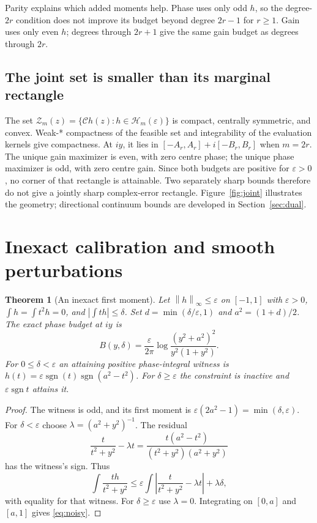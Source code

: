 \documentclass[11pt]{article}
\newtheorem{theorem}{Theorem}[section]
\theoremstyle{remark}\newtheorem{remark}[theorem]{Remark}
\newcommand{\eps}{\varepsilon}
\newcommand{\C}{\mathcal C}
\newcommand{\Hcal}{\mathcal H}
\newcommand{\sgn}{\operatorname{sgn}}
\newcommand{\norm}[1]{\left\lVert#1\right\rVert}
\begin{document}
Parity explains which added moments help. Phase uses only odd $h$, so the
degree-$2r$ condition does not improve its budget beyond degree $2r-1$
for $r\geq1$. Gain uses only even $h$; degrees through $2r+1$ give the same
gain budget as degrees through $2r$.

\subsection{The joint set is smaller than its marginal rectangle}
The set
$\mathcal Z_m(z)=\{\C h(z):h\in\Hcal_m(\eps)\}$
is compact, centrally symmetric, and convex.
Weak-* compactness of the feasible set and integrability of the evaluation
kernels give compactness.
At $iy$, it lies in $[-A_r,A_r]+i[-B_r,B_r]$ when $m=2r$.
The unique gain maximizer is even, with zero centre phase;
the unique phase maximizer is odd, with zero centre gain.
Since both budgets are positive for $\eps>0$, no corner of that rectangle is
attainable. Two separately sharp bounds therefore do not give a jointly sharp
complex-error rectangle.
Figure~\ref{fig:joint} illustrates the geometry; directional continuum bounds
are developed in Section~\ref{sec:dual}.

\section{Inexact calibration and smooth perturbations}\label{sec:noisy}
\begin{theorem}[An inexact first moment]\label{thm:noisy}
Let $\norm h_\infty\leq\eps$ on $[-1,1]$ with $\eps>0$,
$\int h=\int t^2h=0$, and $|\int th|\leq\delta$.
Set $d=\min(\delta/\eps,1)$ and $a^2=(1+d)/2$.
The exact phase budget at $iy$ is
\begin{equation}\label{eq:noisy}
 B(y,\delta)=\frac{\eps}{2\pi}
 \log\frac{(y^2+a^2)^2}{y^2(1+y^2)}.
\end{equation}
For $0\leq\delta<\eps$ an attaining positive phase-integral witness is
$h(t)=\eps\sgn(t)\sgn(a^2-t^2)$.
For $\delta\geq\eps$ the constraint is inactive and $\eps\sgn t$ attains it.
\end{theorem}
\begin{proof}
The witness is odd, and its first moment is
$\eps(2a^2-1)=\min(\delta,\eps)$.
For $\delta<\eps$ choose $\lambda=(a^2+y^2)^{-1}$.
The residual
\[
 \frac{t}{t^2+y^2}-\lambda t
 =\frac{t(a^2-t^2)}{(t^2+y^2)(a^2+y^2)}
\]
has the witness's sign. Thus
\[
 \int\frac{th}{t^2+y^2}
 \leq\eps\int\left|\frac{t}{t^2+y^2}-\lambda t\right|+\lambda\delta,
\]
with equality for that witness. For $\delta\geq\eps$ use $\lambda=0$.
Integrating on $[0,a]$ and $[a,1]$ gives \eqref{eq:noisy}.
\end{proof}
\end{document}
